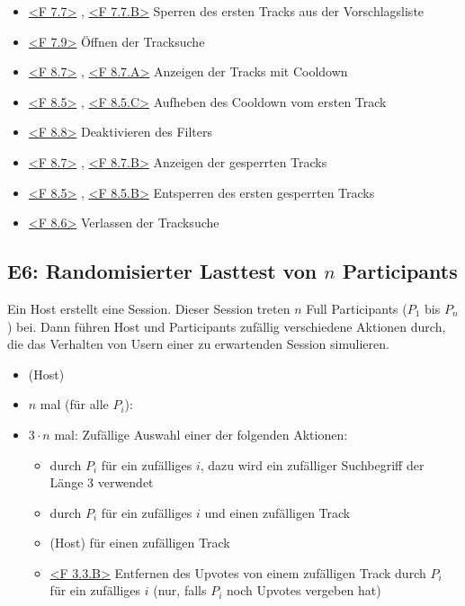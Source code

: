 \documentclass[oneside, ngerman]{sdqtechreport}
\begin{document}
\begin{itemize}
    \item \hyperlink{<F 7.7>}{<F 7.7>} , \hyperlink{<F 7.7.B>}{<F 7.7.B>} Sperren des ersten Tracks aus der Vorschlagsliste
    \item \hyperlink{<F 7.9>}{<F 7.9>} Öffnen der Tracksuche
    \item \hyperlink{<F 8.7>}{<F 8.7>} , \hyperlink{<F 8.7.A>}{<F 8.7.A>} Anzeigen der Tracks mit Cooldown
    \item \hyperlink{<F 8.5>}{<F 8.5>} , \hyperlink{<F 8.5.C>}{<F 8.5.C>} Aufheben des Cooldown vom ersten Track
    \item \hyperlink{<F 8.8>}{<F 8.8>} Deaktivieren des Filters
    \item \hyperlink{<F 8.7>}{<F 8.7>} , \hyperlink{<F 8.7.B>}{<F 8.7.B>} Anzeigen der gesperrten Tracks
    \item \hyperlink{<F 8.5>}{<F 8.5>} , \hyperlink{<F 8.5.B>}{<F 8.5.B>} Entsperren des ersten gesperrten Tracks
    \item \hyperlink{<F 8.6>}{<F 8.6>} Verlassen der Tracksuche
\end{itemize}

\subsection{E6: Randomisierter Lasttest von $n$ Participants}
\label{subsec:Tests:ErweiterteTestszenarien:E3}
Ein Host erstellt eine Session. Dieser Session treten $n$ Full Participants ($P_1$ bis $P_n$) bei. Dann führen Host und Participants zufällig verschiedene Aktionen durch, die das Verhalten von Usern einer zu erwartenden Session simulieren.
\begin{itemize}
    \item \gOne (Host)
    \item $n$ mal (für alle $P_i$): \gTwo
    \item $3\cdot n$ mal: Zufällige Auswahl einer der folgenden Aktionen:
    \begin{itemize}
        \item \gFour durch $P_i$ für ein zufälliges $i$, dazu wird ein zufälliger Suchbegriff der Länge $3$ verwendet
        \item \gSix durch $P_i$ für ein zufälliges $i$ und einen zufälligen Track
        \item \gSeven (Host) für einen zufälligen Track
        \item \hyperlink{<F 3.3.B>}{<F 3.3.B>} Entfernen des Upvotes von einem zufälligen Track durch $P_i$ für ein zufälliges $i$ (nur, falls $P_i$ noch Upvotes vergeben hat)
    \end{itemize}
\end{itemize}
\end{document}
